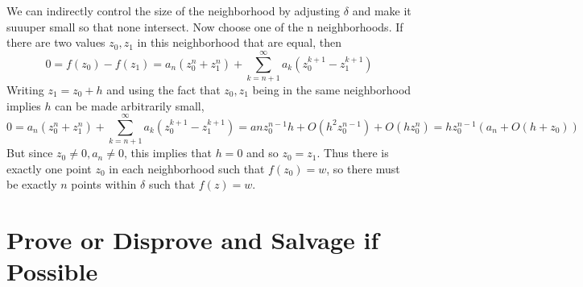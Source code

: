 \documentclass{homework}
\begin{document}
\begin{solution}
                                                                                                                  We can indirectly control the size of the neighborhood by adjusting $\delta$ and make it suuuper small so that none intersect. Now choose one of the n neighborhoods. If there are two values $z_0, z_1$ in this neighborhood that are equal, then 
                                                                                                                  \[0 = f(z_0) - f(z_1) = a_n(z_0^n + z_1^n) + \sum_{k=n+1}^\infty a_k(z_0^{k+1}-z_1^{k+1})\]
                                                                                                                  Writing $z_1 = z_0 + h$ and using the fact that $z_0, z_1$ being in the same neighborhood implies $h$ can be made arbitrarily small,
                                                                                                                  \[
                                                                                                                  0 = a_n(z_0^n + z_1^n) + \sum_{k=n+1}^\infty a_k(z_0^{k+1}-z_1^{k+1}) = anz_0^{n-1}h + O(h^2z_0^{n-1}) + O(hz_0^n) = hz_0^{n-1}(a_n + O(h + z_0))
                                                                                                                  \]
                                                                                                                  But since $z_0\neq 0, a_n\neq 0$, this implies that $h=0$ and so $z_0=z_1$. Thus there is exactly one point $z_0$ in each neighborhood such that $f(z_0)=w$, so there must be exactly $n$ points within $\delta$ such that $f(z)=w$.
                                                                                                                  \end{solution}
                                                                                                                  \section{Prove or Disprove and Salvage if Possible}
\end{document}
